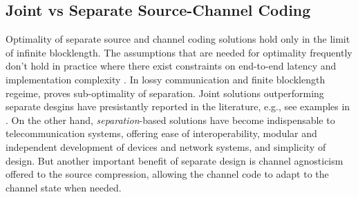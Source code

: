 
\subsection{Joint vs Separate Source-Channel Coding}

Optimality of separate source and channel coding  solutions \cite{shannon1959coding} hold only in the limit of infinite blocklength.  The assumptions that are needed for optimality frequently  don't  hold in practice  where there exist constraints on end-to-end latency and implementation complexity  \cite{zhai2005joint}. In lossy communication and finite blocklength regeime, \cite{6408177} proves sub-optimality of separation.  Joint solutions outperforming separate desgins have presistantly reported in the literature, e.g., see examples in \cite{10747747,lan2021semantic}. On the other hand,  \emph{separation}-based solutions have become indispensable to telecommunication systems,  offering ease of interoperability, modular and independent development of devices and network systems, and simplicity of  design. But another important benefit of separate design is channel agnosticism offered to the source compression, allowing the channel code to adapt to the channel state when needed.

